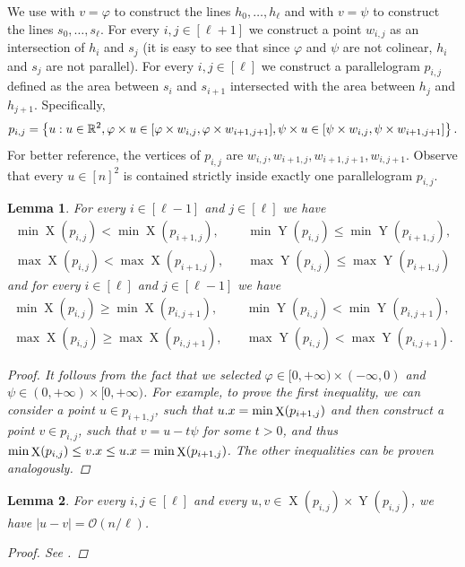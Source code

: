 \documentclass[11pt]{article}
\newcommand{\R}{\mathbb{R}}
\renewcommand{\O}{\mathcal{O}}
\renewcommand{\phi}{\varphi}
\newcommand{\set}[1]{\left\lbrace #1 \right\rbrace}
\newcommand{\eq}[1]{\begin{align*} #1 \end{align*}}
\theoremstyle{plain}
\newtheorem{lemma}{Lemma}
\theoremstyle{definition}
\theoremstyle{remark}
\DeclareMathOperator*{\X}{X}
\DeclareMathOperator*{\Y}{Y}
\begin{document}
We use  with $v = \phi$ to construct the lines $h_0, \dots, h_\ell$ and with $v = \psi$ to construct the lines $s_0, \dots, s_\ell$.
For every $i, j \in [\ell + 1]$ we construct a point $w_{i, j}$ as an intersection of $h_i$ and $s_j$ (it is easy to see that since $\phi$ and $\psi$ are not colinear, $h_i$ and $s_j$ are not parallel).
For every $i, j \in [\ell]$ we construct a parallelogram $p_{i, j}$ defined as the area between $s_i$ and $s_{i + 1}$ intersected with the area between $h_j$ and $h_{j + 1}$.
Specifically,
\[p_{i, j} = \set{u : u \in \R^2, \h{u} \in [\h{w_{i, j}}, \h{w_{i + 1, j + 1}}], \s{u} \in [\s{w_{i, j}}, \s{w_{i + 1, j + 1}}]}.\]
For better reference, the vertices of $p_{i, j}$ are $w_{i, j}, w_{i + 1, j}, w_{i + 1, j + 1}, w_{i, j + 1}$.
Observe that every $u \in [n]^2$ is contained strictly inside exactly one parallelogram $p_{i, j}$.

\begin{lemma}\label{monotonicity_lemma}
	For every $i \in [\ell - 1]$ and $j \in [\ell]$ we have
	\eq{
	\min \X(p_{i, j}) < \min \X(p_{i + 1, j}), \quad
	&\min \Y(p_{i, j}) \le \min \Y(p_{i + 1, j}), \\
	\max \X(p_{i, j}) < \max \X(p_{i + 1, j}), \quad
	&\max \Y(p_{i, j}) \le \max \Y(p_{i + 1, j})
	}
	and for every $i \in [\ell]$ and $j \in [\ell - 1]$ we have
	\eq{
		\min \X(p_{i, j}) \ge \min \X(p_{i, j + 1}), \quad
		&\min \Y(p_{i, j}) < \min \Y(p_{i, j + 1}), \\
		\max \X(p_{i, j}) \ge \max \X(p_{i, j + 1}), \quad
		&\max \Y(p_{i, j}) < \max \Y(p_{i, j + 1}).
	}
	\begin{proof}
		It follows from the fact that we selected $\phi \in [0, +\infty) \times (-\infty, 0)$ and $\psi \in (0, +\infty) \times [0, +\infty)$.
		For example, to prove the first inequality, we can consider a point $u \in p_{i + 1, j}$, such that $\x{u} = \min \X(p_{i + 1, j})$
		and then construct a point $v \in p_{i, j}$, such that $v = u - t\psi$ for some $t > 0$, and thus $\min \X(p_{i, j}) \le \x{v} \le \x{u} = \min \X(p_{i + 1, j})$.
		The other inequalities can be proven analogously.
	\end{proof}
\end{lemma}

\begin{lemma}\label{distance_bound_lemma}
	For every $i, j \in [\ell]$ and every $u, v \in \X(p_{i, j}) \times \Y(p_{i, j})$, we have $|u - v| = \O(n / \ell)$.
	\begin{proof} See . \end{proof}
\end{lemma}
\end{document}
